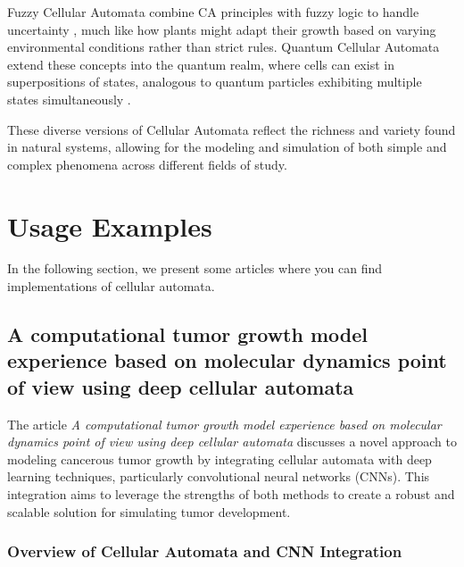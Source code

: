 \documentclass[9pt,a4paper,twoside]{tau-class/tau}
\begin{document}
Fuzzy Cellular Automata combine CA principles with fuzzy logic to handle uncertainty \cite{pedrycz2010}, much like how plants might adapt their growth based on varying environmental conditions rather than strict rules. Quantum Cellular Automata extend these concepts into the quantum realm, where cells can exist in superpositions of states, analogous to quantum particles exhibiting multiple states simultaneously \cite{brennen2003}.

These diverse versions of Cellular Automata reflect the richness and variety found in natural systems, allowing for the modeling and simulation of both simple and complex phenomena across different fields of study.



\section{Usage Examples}
In the following section, we present some articles where you can find implementations of cellular automata.

\subsection{ A computational tumor growth model experience based on molecular dynamics point of view using deep cellular automata }

The article \textit{A computational tumor growth model experience based on molecular dynamics point of view using deep cellular automata} discusses a novel approach to modeling cancerous tumor growth by integrating cellular automata  with deep learning techniques, particularly convolutional neural networks (CNNs). This integration aims to leverage the strengths of both methods to create a robust and scalable solution for simulating tumor development.\cite{MATIN2024102752}

\subsubsection{Overview of Cellular Automata and CNN Integration}
\end{document}
